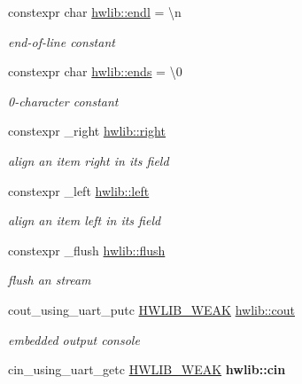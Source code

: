 \begin{DoxyCompactItemize}
\item 
constexpr char \hyperlink{namespacehwlib_a89ce110cc897f61657f1edca18e4cef7}{hwlib\+::endl} = \textquotesingle{}\textbackslash{}n\textquotesingle{}\hypertarget{namespacehwlib_a89ce110cc897f61657f1edca18e4cef7}{}\label{namespacehwlib_a89ce110cc897f61657f1edca18e4cef7}

\begin{DoxyCompactList}\small\item\em end-\/of-\/line constant \end{DoxyCompactList}\item 
constexpr char \hyperlink{namespacehwlib_ac708935d0fc9beb71bb55a7c35e69a16}{hwlib\+::ends} = \textquotesingle{}\textbackslash{}0\textquotesingle{}\hypertarget{namespacehwlib_ac708935d0fc9beb71bb55a7c35e69a16}{}\label{namespacehwlib_ac708935d0fc9beb71bb55a7c35e69a16}

\begin{DoxyCompactList}\small\item\em 0-\/character constant \end{DoxyCompactList}\item 
constexpr \+\_\+right \hyperlink{namespacehwlib_a26a6aead1d4dc1a990ab77bf2b730740}{hwlib\+::right}
\begin{DoxyCompactList}\small\item\em align an item right in its field \end{DoxyCompactList}\item 
constexpr \+\_\+left \hyperlink{namespacehwlib_a7d9a4ef3e66da75048c5b3e67cf401d8}{hwlib\+::left}
\begin{DoxyCompactList}\small\item\em align an item left in its field \end{DoxyCompactList}\item 
constexpr \+\_\+flush \hyperlink{namespacehwlib_a648fe94ca9899747a632c23f97007732}{hwlib\+::flush}
\begin{DoxyCompactList}\small\item\em flush an stream \end{DoxyCompactList}\item 
cout\+\_\+using\+\_\+uart\+\_\+putc \hyperlink{hwlib-defines_8hpp_a04be4340016df60d6636c1d1c6d94fc9}{H\+W\+L\+I\+B\+\_\+\+W\+E\+AK} \hyperlink{namespacehwlib_ac985c212834e4eb219aedede6efff2dc}{hwlib\+::cout}
\begin{DoxyCompactList}\small\item\em embedded output console \end{DoxyCompactList}\item 
cin\+\_\+using\+\_\+uart\+\_\+getc \hyperlink{hwlib-defines_8hpp_a04be4340016df60d6636c1d1c6d94fc9}{H\+W\+L\+I\+B\+\_\+\+W\+E\+AK} {\bfseries hwlib\+::cin}\hypertarget{namespacehwlib_a8f672f745fb7a27fe652c442779bd65d}{}\label{namespacehwlib_a8f672f745fb7a27fe652c442779bd65d}

\end{DoxyCompactItemize}
